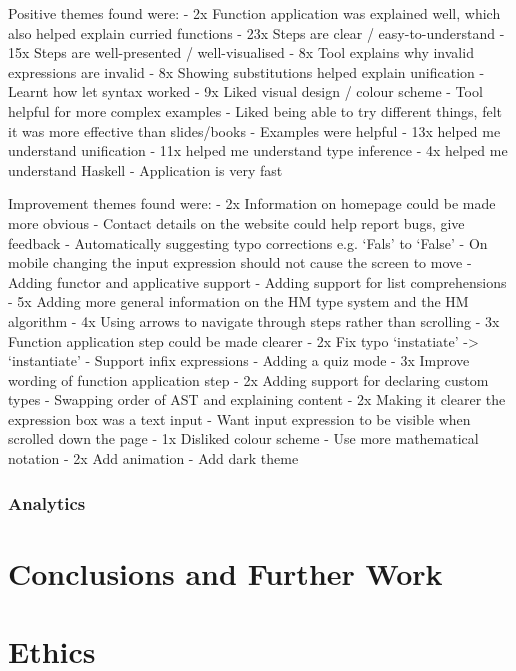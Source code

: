 \documentclass[a4paper,fleqn,12pt]{article}
\begin{document}
Positive themes found were:
- 2x Function application was explained well, which also helped explain curried functions
- 23x Steps are clear / easy-to-understand
- 15x Steps are well-presented / well-visualised
- 8x Tool explains why invalid expressions are invalid
- 8x Showing substitutions helped explain unification
- Learnt how let syntax worked
- 9x Liked visual design / colour scheme
- Tool helpful for more complex examples
- Liked being able to try different things, felt it was more effective than slides/books
- Examples were helpful
- 13x helped me understand unification
- 11x helped me understand type inference
- 4x helped me understand Haskell
- Application is very fast

Improvement themes found were:
- 2x Information on homepage could be made more obvious
- Contact details on the website could help report bugs, give feedback
- Automatically suggesting typo corrections e.g. ‘Fals’ to ‘False’
- On mobile changing the input expression should not cause the screen to move
- Adding functor and applicative support
- Adding support for list comprehensions
- 5x Adding more general information on the HM type system and the HM algorithm
- 4x Using arrows to navigate through steps rather than scrolling
- 3x Function application step could be made clearer
- 2x Fix typo ‘instatiate’ -> ‘instantiate’
- Support infix expressions
- Adding a quiz mode
- 3x Improve wording of function application step
- 2x Adding support for declaring custom types
- Swapping order of AST and explaining content
- 2x Making it clearer the expression box was a text input
- Want input expression to be visible when scrolled down the page
- 1x Disliked colour scheme
- Use more mathematical notation
- 2x Add animation
- Add dark theme
\subsubsection{Analytics}\label{id:h.67g05flyfv0z}

\section{Conclusions and Further Work}\label{id:h.fc67ipatea73}

\section{Ethics}\label{id:h.i0n8c6hqdr6j}
\end{document}
